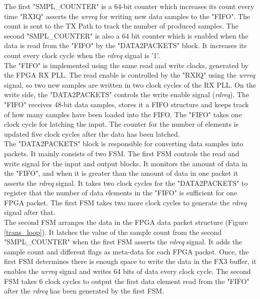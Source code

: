 The first "SMPL\_COUNTER" is a 64-bit counter which increases its count every time "RXIQ" asserts the \textit{wrreq} for writing new data samples to the "FIFO". 
The count is sent to the TX Path to track the number of produced samples. 
The second "SMPL\_COUNTER" is also a 64 bit counter which is enabled when the data is read from the "FIFO" by the "DATA2PACKETS" block.
It increases its count every clock cycle when the \textit{rdreq} signal is '1'.\\

The "FIFO" is implemented using the same read and write clocks, generated by the FPGA RX \ac{PLL}.
The read enable is controlled by the "RXIQ" using the \textit{wrreq} signal, so two new samples are written in two clock cycles of the RX PLL.
On the write side, the "DATA2PACKETS" controls the write enable signal (\textit{rdreq}).
The "FIFO" receives 48-bit data samples, stores it a \ac{FIFO} structure and keeps track of how many samples have been loaded into the \ac{FIFO}.
The "FIFO" takes one clock cycle for latching the input.
The counter for the number of elements is updated five clock cycles after the data has been latched.
\\

The "DATA2PACKETS" block is responsible for converting data samples into packets.
It mainly consists of two \ac{FSM}.
The first  \ac{FSM} controls the read and write signal for the input and output blocks.
It monitors the amount of data in the "FIFO", and when it is greater than the amount of data in one packet it asserts the \textit{rdreq} signal.
It takes two clock cycles for the "DATA2PACKETS" to register that the number of data elements in the "FIFO" is sufficient for one \ac{FPGA} packet.
The first \ac{FSM} takes two more clock cycles to generate the \textit{rdreq} signal after that.\\ 

The second \ac{FSM} arranges the data in the FPGA data packet structure (Figure \ref{trans_loop}).
It latches the value of the sample count from the second "SMPL\_COUNTER" when the first \ac{FSM} asserts the \textit{rdreq} signal.
It adds the sample count and different flags as meta-data for each \ac{FPGA} packet. 
Once, the first \ac{FSM} determines there is enough space to write the data in the FX3 buffer, it enables the \textit{wrreq} signal and writes 64 bits of data every clock cycle.
The second \ac{FSM} takes 6 clock cycles to output the first data element read from the "FIFO" after the \textit{rdreq} has been generated by the first \ac{FSM}.\\

